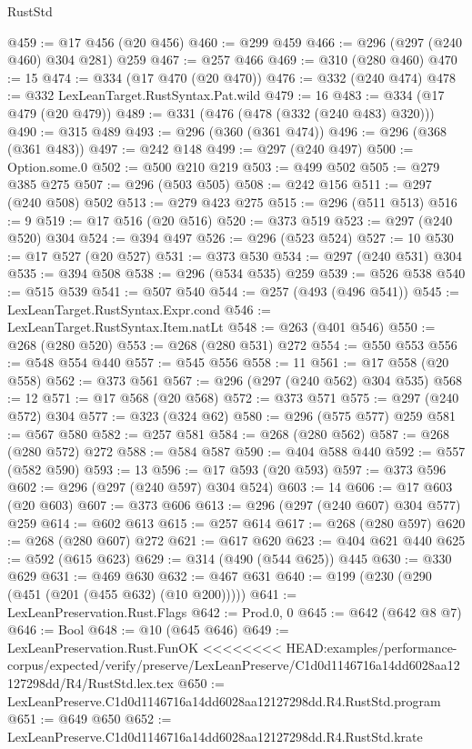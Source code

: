 \begin{lexlean}{RustStd}
\begin{coremodule}
{\begin{coremodule}
{{{{{{{@459 := @17 @456 (@20 @456)
@460 := @299 @459
@466 := @296 (@297 (@240 @460) @304 @281) @259
@467 := @257 @466
@469 := @310 (@280 @460)
@470 := 15
@474 := @334 (@17 @470 (@20 @470))
@476 := @332 (@240 @474)
@478 := @332 LexLeanTarget.RustSyntax.Pat.wild
@479 := 16
@483 := @334 (@17 @479 (@20 @479))
@489 := @331 (@476 (@478 (@332 (@240 @483) @320)))
@490 := @315 @489
@493 := @296 (@360 (@361 @474))
@496 := @296 (@368 (@361 @483))
@497 := @242 @148
@499 := @297 (@240 @497)
@500 := Option.some.{0}
@502 := @500 @210 @219
@503 := @499 @502
@505 := @279 @385 @275
@507 := @296 (@503 @505)
@508 := @242 @156
@511 := @297 (@240 @508) @502
@513 := @279 @423 @275
@515 := @296 (@511 @513)
@516 := 9
@519 := @17 @516 (@20 @516)
@520 := @373 @519
@523 := @297 (@240 @520) @304
@524 := @394 @497
@526 := @296 (@523 @524)
@527 := 10
@530 := @17 @527 (@20 @527)
@531 := @373 @530
@534 := @297 (@240 @531) @304
@535 := @394 @508
@538 := @296 (@534 @535) @259
@539 := @526 @538
@540 := @515 @539
@541 := @507 @540
@544 := @257 (@493 (@496 @541))
@545 := LexLeanTarget.RustSyntax.Expr.cond
@546 := LexLeanTarget.RustSyntax.Item.natLt
@548 := @263 (@401 @546)
@550 := @268 (@280 @520)
@553 := @268 (@280 @531) @272
@554 := @550 @553
@556 := @548 @554 @440
@557 := @545 @556
@558 := 11
@561 := @17 @558 (@20 @558)
@562 := @373 @561
@567 := @296 (@297 (@240 @562) @304 @535)
@568 := 12
@571 := @17 @568 (@20 @568)
@572 := @373 @571
@575 := @297 (@240 @572) @304
@577 := @323 (@324 @62)
@580 := @296 (@575 @577) @259
@581 := @567 @580
@582 := @257 @581
@584 := @268 (@280 @562)
@587 := @268 (@280 @572) @272
@588 := @584 @587
@590 := @404 @588 @440
@592 := @557 (@582 @590)
@593 := 13
@596 := @17 @593 (@20 @593)
@597 := @373 @596
@602 := @296 (@297 (@240 @597) @304 @524)
@603 := 14
@606 := @17 @603 (@20 @603)
@607 := @373 @606
@613 := @296 (@297 (@240 @607) @304 @577) @259
@614 := @602 @613
@615 := @257 @614
@617 := @268 (@280 @597)
@620 := @268 (@280 @607) @272
@621 := @617 @620
@623 := @404 @621 @440
@625 := @592 (@615 @623)
@629 := @314 (@490 (@544 @625)) @445
@630 := @330 @629
@631 := @469 @630
@632 := @467 @631
@640 := @199 (@230 (@290 (@451 (@201 (@455 @632) (@10 @200)))))
@641 := LexLeanPreservation.Rust.Flags
@642 := Prod.{0, 0}
@645 := @642 (@642 @8 @7)
@646 := Bool
@648 := @10 (@645 @646)
@649 := LexLeanPreservation.Rust.FunOK
<<<<<<<< HEAD:examples/performance-corpus/expected/verify/preserve/LexLeanPreserve/C1d0d1146716a14dd6028aa12127298dd/R4/RustStd.lex.tex
@650 := LexLeanPreserve.C1d0d1146716a14dd6028aa12127298dd.R4.RustStd.program
@651 := @649 @650
@652 := LexLeanPreserve.C1d0d1146716a14dd6028aa12127298dd.R4.RustStd.krate
}}}}}}}
\end{coremodule}}
\end{coremodule}
\end{lexlean}

